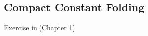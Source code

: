 
\subsection{Compact Constant Folding}
\label{sec:design:constants}

Exercise in \cite{Pierce:SF2} (Chapter 1)
